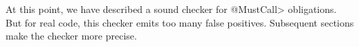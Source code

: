 At this point, we have described a sound checker for \<@MustCall> obligations.
But for real code, this checker emits too many false positives.  Subsequent
sections make the checker more precise.





